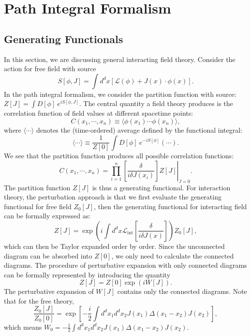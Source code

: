 \documentclass[aps,prb,superscriptaddress,nofootinbib]{revtex4}
\begin{document}
\section{Path Integral Formalism}

\subsection{Generating Functionals}
In this section, we are discussing general interacting field theory.
Consider the action for free field with source
\begin{equation}
	S[\phi,J]
	= \int d^dx\left[\mathcal{L}(\phi) + J(x)\cdot\phi(x) \right].
\end{equation}
In the path integral formalism, we consider the partition function with source: $Z[J] = \int D[\phi]\ e^{iS[\phi,J]}$.
The central quantity a field theory produces is the correlation function of field values at different spacetime points:
\begin{equation}
	C(x_1,\cdots,x_n) \equiv \langle \phi(x_1)\cdots \phi(x_n)\rangle,
\end{equation}
where $\langle \cdots \rangle$ denotes the (time-ordered) average defined by the functional integral:
\begin{equation}
	\langle \cdots \rangle \equiv \frac{1}{Z[0]}\int D[\phi]\ e^{-iS[\phi]} (\cdots).
\end{equation}
We see that the partition function produces all possible correlation functions:
\begin{equation}
	C(x_1,\cdots,x_n) = \left. \prod_{i=1}^n \left[\frac{\delta}{i\delta J(x_i)}\right] Z[J] \right|_{J=0}.
\end{equation}
The partition function $Z[J]$ is thus a generating functional.
For interaction theory, the perturbation approach is that we first evaluate the generating functional for free field $Z_0[J]$, then the generating functional for interacting field can be formally expressed as:
\begin{equation}
	Z[J] = \exp\left(i\int d^dx \mathcal{L}_{\mathrm{int}}\left[\frac{\delta}{i\delta J(x)}\right]\right)Z_0[J],
\end{equation}
which can then be Taylor expanded order by order.
Since the unconnected diagram can be absorbed into $Z[0]$, we only need to calculate the connected diagrams.
The procedure of perturbative expansion with only connected diagrams can be formally represented by introducing the quantity 
\begin{equation}
	Z[J] = Z[0]\exp\left(i W[J]\right).
\end{equation}
The perturbative expansion of $W[J]$ contains only the connected diagrams.
Note that for the free theory,
\begin{equation*}
	\frac{Z_0[J]}{Z_0[0]} = \exp\left[-\frac{i}{2}\int d^d x_1 d^d x_2 J(x_1) \Delta(x_1-x_2)J(x_2)\right],
\end{equation*}
which means $W_0 = -\frac{1}{2}\int d^d x_1 d^d x_2 J(x_1) \Delta(x_1-x_2)J(x_2)$.
\end{document}
